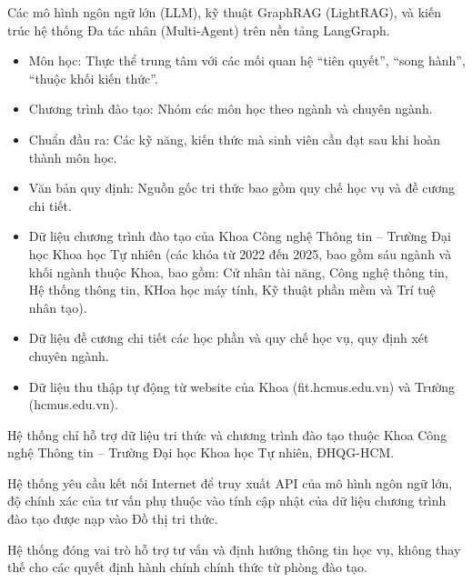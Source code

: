 \documentclass{article}[13pt]
\begin{document}
{     Các mô hình ngôn ngữ lớn (LLM), kỹ thuật GraphRAG (LightRAG), và kiến trúc hệ thống Đa tác nhân (Multi-Agent) trên nền tảng LangGraph.

    \medskip
    \begin{itemize}[label={--}, leftmargin=1.5em]
        \item Môn học: Thực thể trung tâm với các mối quan hệ ``tiên quyết'', ``song hành'', ``thuộc khối kiến thức''.
        \item Chương trình đào tạo: Nhóm các môn học theo ngành và chuyên ngành.
        \item Chuẩn đầu ra: Các kỹ năng, kiến thức mà sinh viên cần đạt sau khi hoàn thành môn học.
        \item Văn bản quy định: Nguồn gốc tri thức bao gồm quy chế học vụ và đề cương chi tiết.
    \end{itemize}

    \medskip
    \begin{itemize}[label={--}, leftmargin=1.5em]
        \item Dữ liệu chương trình đào tạo của Khoa Công nghệ Thông tin -- Trường Đại học Khoa học Tự nhiên (các khóa từ 2022 đến 2025, bao gồm sáu ngành và khối ngành thuộc Khoa, bao gồm: Cử nhân tài năng, Công nghệ thông tin, Hệ thống thông tin, KHoa học máy tính, Kỹ thuật phần mềm và Trí tuệ nhân tạo).
        \item Dữ liệu đề cương chi tiết các học phần và quy chế học vụ, quy định xét chuyên ngành.
        \item Dữ liệu thu thập tự động từ website của Khoa (fit.hcmus.edu.vn) và Trường (hcmus.edu.vn).
    \end{itemize}

    \medskip
     Hệ thống chỉ hỗ trợ dữ liệu tri thức và chương trình đào tạo thuộc Khoa Công nghệ Thông tin -- Trường Đại học Khoa học Tự nhiên, ĐHQG-HCM.

    \medskip
     Hệ thống yêu cầu kết nối Internet để truy xuất API của mô hình ngôn ngữ lớn, độ chính xác của tư vấn phụ thuộc vào tính cập nhật của dữ liệu chương trình đào tạo được nạp vào Đồ thị tri thức.

    \medskip
     Hệ thống đóng vai trò hỗ trợ tư vấn và định hướng thông tin học vụ, không thay thế cho các quyết định hành chính chính thức từ phòng đào tạo.

}
\end{document}
